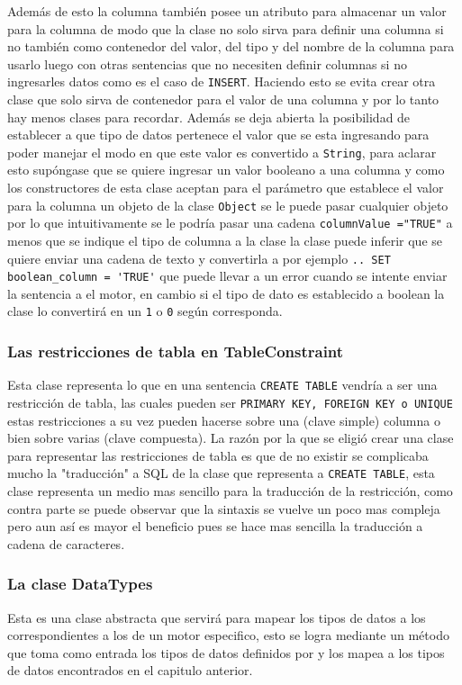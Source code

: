 Además de esto la columna también posee un atributo para almacenar un valor para la columna de modo que la clase no solo sirva para definir una columna si no también como contenedor del valor, del tipo y del nombre  de la columna para usarlo luego con otras sentencias que no necesiten definir columnas si no ingresarles datos como es el caso de \verb=INSERT=. Haciendo esto se evita crear otra clase que solo sirva de contenedor para el valor de una columna y por lo tanto hay menos clases para recordar. Además se deja abierta la posibilidad de establecer a que tipo de datos pertenece el valor que se esta ingresando para poder manejar el modo en que este valor es convertido a \verb=String=, para aclarar esto supóngase que se quiere ingresar un valor booleano a una columna y como los constructores de esta clase aceptan para el parámetro que establece el valor para la columna un objeto de la clase \verb=Object= se le puede pasar cualquier objeto por lo que intuitivamente se le podría pasar una cadena \verb|columnValue ="TRUE"| a menos que se indique el tipo de columna a la clase la clase puede inferir que se quiere enviar una cadena de texto y convertirla a  por ejemplo \verb|.. SET boolean_column = 'TRUE'| que puede llevar a un error cuando se intente enviar la sentencia a el motor, en cambio si el tipo de dato es establecido a boolean la clase lo convertirá en un \verb=1= o \verb=0= según corresponda.

\subsubsection{Las restricciones de tabla en TableConstraint}
Esta clase representa lo que en una sentencia \verb=CREATE TABLE= vendría a ser una restricción de tabla, las cuales pueden ser \verb=PRIMARY KEY, FOREIGN KEY o UNIQUE= estas restricciones a su vez pueden hacerse sobre una (clave simple) columna o bien sobre varias (clave compuesta). La razón por la que se eligió crear una clase para representar las restricciones de tabla es que de no existir se complicaba mucho la "traducción" a SQL de la clase que representa a \verb=CREATE TABLE=, esta clase representa un medio mas sencillo para la traducción de la restricción, como contra parte se puede observar que la sintaxis se vuelve un poco mas compleja pero aun así es mayor el beneficio pues se hace mas sencilla la traducción a cadena de caracteres. 

\subsubsection{La clase DataTypes}
Esta es una clase abstracta que servirá para mapear los tipos de datos a los correspondientes a los de un motor especifico, esto se logra mediante un método que toma como entrada los tipos de datos definidos por \jd y los mapea a los tipos de datos encontrados en el capitulo anterior.



